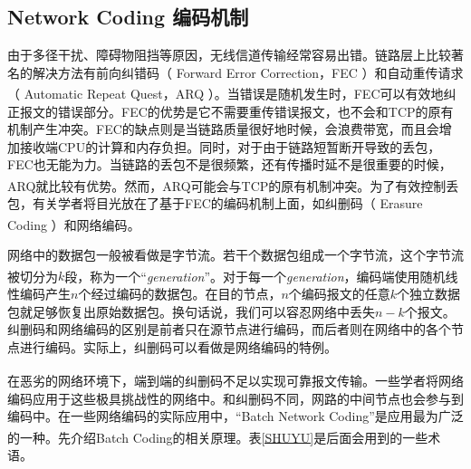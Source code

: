 \subsection{Network Coding 编码机制}
由于多径干扰、障碍物阻挡等原因，无线信道传输经常容易出错。链路层上比较著名的解决方法有前向纠错码（ Forward Error Correction，FEC ）和自动重传请求（ Automatic Repeat Quest，ARQ ）\textsuperscript{\cite{kurose2005computer}}。当错误是随机发生时，FEC可以有效地纠正报文的错误部分。FEC的优势是它不需要重传错误报文，也不会和TCP的原有机制产生冲突。FEC的缺点则是当链路质量很好地时候，会浪费带宽，而且会增加接收端CPU的计算和内存负担。同时，对于由于链路短暂断开导致的丢包，FEC也无能为力。当链路的丢包不是很频繁，还有传播时延不是很重要的时候，ARQ就比较有优势。然而，ARQ可能会与TCP的原有机制冲突\textsuperscript{\cite{kurose2005computer}}。为了有效控制丢包，有关学者将目光放在了基于FEC的编码机制上面，如纠删码（ Erasure Coding ）\textsuperscript{\cite{rizzo1997effective}}和网络编码\textsuperscript{\cite{Ahlswede2000,chou2003practical,algebraicapproach}}。
\par
网络中的数据包一般被看做是字节流。若干个数据包组成一个字节流，这个字节流被切分为$k$段，称为一个“\emph{generation}”\textsuperscript{\cite{chou2003practical}}。对于每一个\emph{generation}，编码端使用随机线性编码产生$n$个经过编码的数据包。在目的节点，$n$个编码报文的任意$k$个独立数据包就足够恢复出原始数据包。换句话说，我们可以容忍网络中丢失$n-k$个报文。纠删码和网络编码的区别是前者只在源节点进行编码，而后者则在网络中的各个节点进行编码。实际上，纠删码可以看做是网络编码的特例。
\par
在恶劣的网络环境下，端到端的纠删码不足以实现可靠报文传输\textsuperscript{\cite{4753100}}。一些学者将网络编码应用于这些极具挑战性的网络中。和纠删码不同，网路的中间节点也会参与到编码中。在一些网络编码的实际应用中，“Batch Network Coding”是应用最为广泛的一种\textsuperscript{\cite{chachulski2007trading,algebraicapproach,chou2003practical,ho2003randomized,chen2009codecast,4015713}}。先介绍Batch Coding的相关原理。表\ref{SHUYU}是后面会用到的一些术语。
